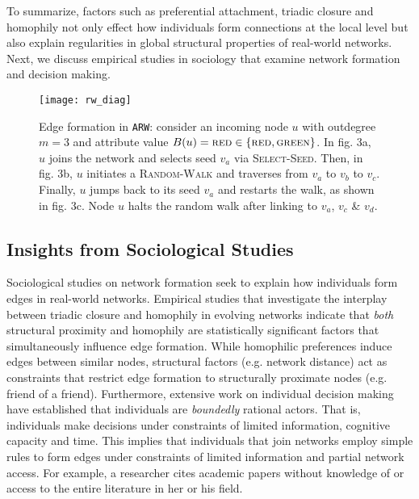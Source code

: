 To summarize, factors such as preferential attachment, triadic closure and homophily not only effect how individuals
form connections at the local level but also explain regularities in
global structural properties of real-world networks.
Next, we discuss empirical studies in sociology that examine network formation
and decision making.

\begin{figure*}[b]
    \centering
    \texttt{[image: rw\_diag]}
    \caption{Edge formation in \texttt{ARW}: consider
    an incoming node $u$ with outdegree ${m=3}$ and attribute value {$B(u)=\textsc{red} \in \{\textsc{red},\textsc{green}\}$}.
    In fig. 3a, $u$ joins the network and selects seed $v_a$ via \textsc{Select-Seed}.
    Then, in fig. 3b, $u$ initiates a \textsc{Random-Walk} and traverses from $v_a$ to $v_b$ to $v_c$.
    Finally, $u$ jumps back to its seed $v_a$ and restarts the walk, as shown in fig. 3c.
    Node $u$ halts the random walk after linking to $v_a$, $v_c$ \& $v_d$.
    }
    \label{fig:randomwalk}
\end{figure*}


\subsection{Insights from Sociological Studies}

Sociological studies on network formation seek to explain
how individuals form edges in real-world networks.
Empirical studies
\cite{35626,block2014multidimensional} that investigate
the interplay between triadic closure and homophily in evolving networks
indicate that \textit{both} structural proximity and homophily are statistically
significant factors that simultaneously influence edge formation. While homophilic preferences
\cite{mcpherson2001birds} induce edges between similar nodes,
structural factors (e.g. network distance) act as constraints that restrict
edge formation to structurally proximate nodes (e.g. friend of a friend).
Furthermore, extensive work \cite{simon1972theories,gigerenzer1996reasoning,lipman1995information}
on individual decision making have established that individuals are \textit{boundedly}
rational actors. That is, individuals make decisions under constraints of limited
information, cognitive capacity and time. This implies that individuals that join networks
employ simple rules to form edges under constraints of limited information and partial network access.
For example, a researcher cites academic papers without knowledge of or access
to the entire literature in her or his field.

